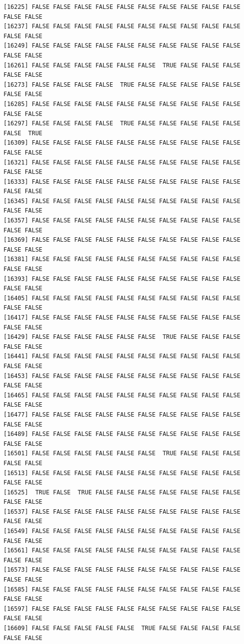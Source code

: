 \documentclass[
  a4paper,
  DIV=11,
  numbers=noendperiod]{scrartcl}
\begin{document}
\begin{verbatim}
[16225] FALSE FALSE FALSE FALSE FALSE FALSE FALSE FALSE FALSE FALSE FALSE FALSE
[16237] FALSE FALSE FALSE FALSE FALSE FALSE FALSE FALSE FALSE FALSE FALSE FALSE
[16249] FALSE FALSE FALSE FALSE FALSE FALSE FALSE FALSE FALSE FALSE FALSE FALSE
[16261] FALSE FALSE FALSE FALSE FALSE FALSE  TRUE FALSE FALSE FALSE FALSE FALSE
[16273] FALSE FALSE FALSE FALSE  TRUE FALSE FALSE FALSE FALSE FALSE FALSE FALSE
[16285] FALSE FALSE FALSE FALSE FALSE FALSE FALSE FALSE FALSE FALSE FALSE FALSE
[16297] FALSE FALSE FALSE FALSE  TRUE FALSE FALSE FALSE FALSE FALSE FALSE  TRUE
[16309] FALSE FALSE FALSE FALSE FALSE FALSE FALSE FALSE FALSE FALSE FALSE FALSE
[16321] FALSE FALSE FALSE FALSE FALSE FALSE FALSE FALSE FALSE FALSE FALSE FALSE
[16333] FALSE FALSE FALSE FALSE FALSE FALSE FALSE FALSE FALSE FALSE FALSE FALSE
[16345] FALSE FALSE FALSE FALSE FALSE FALSE FALSE FALSE FALSE FALSE FALSE FALSE
[16357] FALSE FALSE FALSE FALSE FALSE FALSE FALSE FALSE FALSE FALSE FALSE FALSE
[16369] FALSE FALSE FALSE FALSE FALSE FALSE FALSE FALSE FALSE FALSE FALSE FALSE
[16381] FALSE FALSE FALSE FALSE FALSE FALSE FALSE FALSE FALSE FALSE FALSE FALSE
[16393] FALSE FALSE FALSE FALSE FALSE FALSE FALSE FALSE FALSE FALSE FALSE FALSE
[16405] FALSE FALSE FALSE FALSE FALSE FALSE FALSE FALSE FALSE FALSE FALSE FALSE
[16417] FALSE FALSE FALSE FALSE FALSE FALSE FALSE FALSE FALSE FALSE FALSE FALSE
[16429] FALSE FALSE FALSE FALSE FALSE FALSE  TRUE FALSE FALSE FALSE FALSE FALSE
[16441] FALSE FALSE FALSE FALSE FALSE FALSE FALSE FALSE FALSE FALSE FALSE FALSE
[16453] FALSE FALSE FALSE FALSE FALSE FALSE FALSE FALSE FALSE FALSE FALSE FALSE
[16465] FALSE FALSE FALSE FALSE FALSE FALSE FALSE FALSE FALSE FALSE FALSE FALSE
[16477] FALSE FALSE FALSE FALSE FALSE FALSE FALSE FALSE FALSE FALSE FALSE FALSE
[16489] FALSE FALSE FALSE FALSE FALSE FALSE FALSE FALSE FALSE FALSE FALSE FALSE
[16501] FALSE FALSE FALSE FALSE FALSE FALSE  TRUE FALSE FALSE FALSE FALSE FALSE
[16513] FALSE FALSE FALSE FALSE FALSE FALSE FALSE FALSE FALSE FALSE FALSE FALSE
[16525]  TRUE FALSE  TRUE FALSE FALSE FALSE FALSE FALSE FALSE FALSE FALSE FALSE
[16537] FALSE FALSE FALSE FALSE FALSE FALSE FALSE FALSE FALSE FALSE FALSE FALSE
[16549] FALSE FALSE FALSE FALSE FALSE FALSE FALSE FALSE FALSE FALSE FALSE FALSE
[16561] FALSE FALSE FALSE FALSE FALSE FALSE FALSE FALSE FALSE FALSE FALSE FALSE
[16573] FALSE FALSE FALSE FALSE FALSE FALSE FALSE FALSE FALSE FALSE FALSE FALSE
[16585] FALSE FALSE FALSE FALSE FALSE FALSE FALSE FALSE FALSE FALSE FALSE FALSE
[16597] FALSE FALSE FALSE FALSE FALSE FALSE FALSE FALSE FALSE FALSE FALSE FALSE
[16609] FALSE FALSE FALSE FALSE FALSE  TRUE FALSE FALSE FALSE FALSE FALSE FALSE

\end{verbatim}
\end{document}
